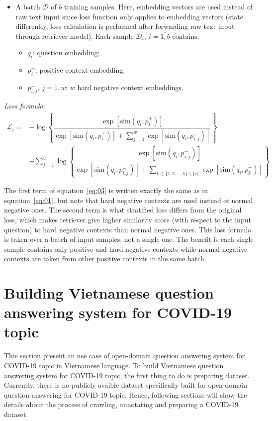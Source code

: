 \documentclass[12pt, sort&compress]{report}
\begin{document}
\begin{itemize}
	\item A batch $\mathcal{D}$ of $b$ training samples. Here, embedding vectors are used instead of raw text input since loss function only applies to embedding vectors (state differently, loss calculation is performed after forwarding raw text input through retriever model). Each sample $\mathcal{D}_i, \:i = \overline{1, b}$ contains:
	\begin{itemize}
		\item $q_i$: question embedding;
		\item $p_i^+$: positive context embedding;
		\item $p_{i,j}^-,\: j=\overline{1, w}$: $w$ hard negative context embeddings.
	\end{itemize} 
\end{itemize}
\par\textit{Loss formula}:
\begin{equation}
	\begin{array}{ll}
		\label{eq:03}
		\mathcal{L}_i = &-\log\left\{\dfrac{\exp\left[{\text{sim}\left(q_i, p_i^+\right)}\right]}{\exp\left[{\text{sim}\left(q_i, p_i^+\right)}\right] + \sum\limits_{j=1}^w\exp\left[\text{sim}\left(q_i, p_{i,j}^-\right)\right]}\right\} \\[40pt]
		&-\sum\limits_{j=1}^w\log\left\{\dfrac{\exp\left[\text{sim}\left(q_i, p_{i,j}^-\right)\right]}{\exp\left[\text{sim}\left(q_i, p_{i,j}^-\right)\right] + \sum\limits_{k\in \{1, 2,..., b\}\backslash\{i\}} \exp\left[\text{sim}\left(q_i, p_k^+\right)\right]}\right\}
	\end{array}
\end{equation}
\par The first term of equation~\eqref{eq:03} is written exactly the same as in equation~\eqref{eq:01}, but note that hard negative contexts are used instead of normal negative ones. The second term is what stratified loss differs from the original loss, which makes retriever give higher similarity score (with respect to the input question) to hard negative contexts than normal negative ones. This loss formula is taken over a batch of input samples, not a single one. The benefit is each single sample contains only positive and hard negative contexts while normal negative contexts are taken from other positive contexts in the same batch. 
\section{Building Vietnamese question answering system for COVID-19 topic}
\label{sec:3.3}
This section present an use case of open-domain question answering system for COVID-19 topic in Vietnamese language. To build Vietnamese question answering system for COVID-19 topic, the first thing to do is preparing dataset. Currently, there is no publicly avaible dataset specifically built for open-domain question answering for COVID-19 topic. Hence, following sections will show the details about the process of crawling, annotating and preparing a COVID-19 dataset.
\end{document}
